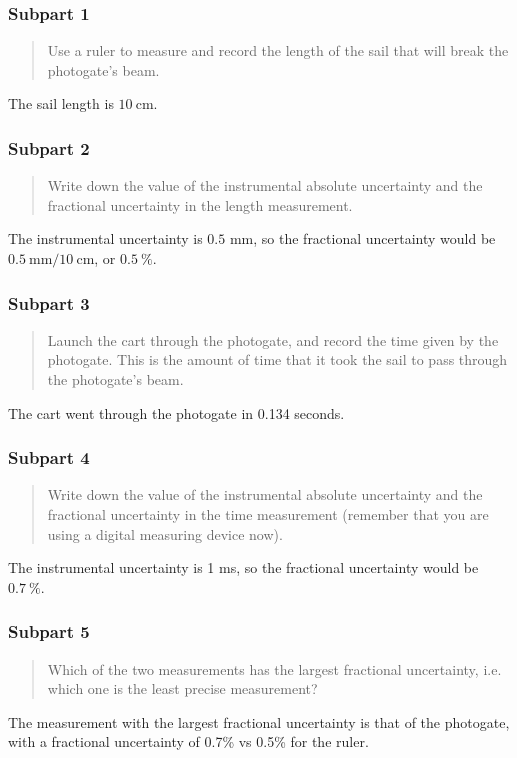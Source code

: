 \documentclass[8pt]{extarticle}
\newcommand{\plain}[1]{\textrm{#1}}
\begin{document}
{\subsubsection*{Subpart 1}
\begin{quote}
	Use a ruler to measure and record the length of the sail that will break the photogate’s beam.
\end{quote}
The sail length is $10~\plain{cm}$.
\subsubsection*{Subpart 2}
\begin{quote}
	Write down the value of the instrumental absolute uncertainty and the fractional uncertainty in the length measurement.
\end{quote}
The instrumental uncertainty is $0.5$ mm, so the fractional uncertainty would be $0.5~\plain{mm}/10~\plain{cm}$, or $0.5~\%$.
\subsubsection*{Subpart 3}
\begin{quote}
	Launch the cart through the photogate, and record the time given by the photogate. This is the amount of time that it took the sail to pass through the photogate’s beam.
\end{quote}
The cart went through the photogate in 0.134 seconds.
\subsubsection*{Subpart 4}
\begin{quote}
	Write down the value of the instrumental absolute uncertainty and the fractional uncertainty in the time measurement (remember that you are using a digital measuring device now).
\end{quote}
The instrumental uncertainty is 1 ms, so the fractional uncertainty would be $0.7~\%$.
\subsubsection*{Subpart 5}
\begin{quote}
	Which of the two measurements has the largest fractional uncertainty, i.e. which one is the least precise measurement?
\end{quote}
The measurement with the largest fractional uncertainty is that of the photogate, with a fractional uncertainty of 0.7\% vs 0.5\% for the ruler.
}
\end{document}
